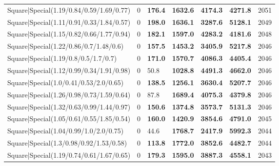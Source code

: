 \begin{tabular}{lrllllr}
 Square|Special(1.19/0.84/0.59/1.69/0.77)                      &             0   & \textbf{176.4} & \textbf{1632.6} & \textbf{4174.3} & \textbf{4271.8} &         2051 \\
 Square|Special(1.11/0.91/0.33/1.84/0.57)                      &             0   & \textbf{198.0} & \textbf{1636.1} & \textbf{3287.6} & \textbf{5128.1} &         2049 \\
 Square|Special(1.15/0.82/0.66/1.77/0.94)                      &             0   & \textbf{182.1} & \textbf{1597.0} & \textbf{4283.2} & \textbf{4181.6} &         2048 \\
 Square|Special(1.22/0.86/0.7/1.48/0.6)                        &             0   & \textbf{157.5} & \textbf{1453.2} & \textbf{3405.9} & \textbf{5217.8} &         2046 \\
 Square|Special(1.19/0.8/0.5/1.7/0.7)                          &             0   & \textbf{171.0} & \textbf{1570.7} & \textbf{4086.3} & \textbf{4405.4} &         2046 \\
 Square|Special(1.12/0.99/0.34/1.91/0.98)                      &             0   & 50.8           & \textbf{1028.8} & \textbf{4491.3} & \textbf{4662.0} &         2046 \\
 Square|Special(1.0/0.41/0.53/2.0/0.65)                        &             0   & \textbf{138.5} & \textbf{1256.1} & \textbf{3630.4} & \textbf{5207.7} &         2046 \\
 Square|Special(1.26/0.98/0.73/1.59/0.64)                      &             0   & 87.8           & \textbf{1689.4} & \textbf{4075.3} & \textbf{4379.8} &         2046 \\
 Square|Special(1.32/0.63/0.99/1.44/0.97)                      &             0   & \textbf{150.6} & \textbf{1374.8} & \textbf{3573.7} & \textbf{5131.3} &         2046 \\
 Square|Special(1.05/0.61/0.55/1.85/0.54)                      &             0   & \textbf{160.0} & \textbf{1420.9} & \textbf{3854.6} & \textbf{4791.0} &         2045 \\
 Square|Special(1.04/0.99/1.0/2.0/0.75)                        &             0   & 44.6           & \textbf{1768.7} & \textbf{2417.9} & \textbf{5992.3} &         2044 \\
 Square|Special(1.3/0.98/0.92/1.53/0.58)                       &             0   & \textbf{113.8} & \textbf{1772.0} & \textbf{3852.6} & \textbf{4482.7} &         2044 \\
 Square|Special(1.19/0.74/0.61/1.67/0.65)                      &             0   & \textbf{179.3} & \textbf{1595.0} & \textbf{3887.3} & \textbf{4558.1} &         2043 \\

\end{tabular}
